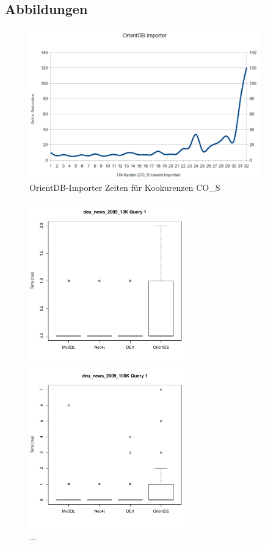 \documentclass[11pt, a4paper, oneside]{article} %
\begin{document}
\begin{appendix}
\section{Abbildungen}

\begin{figure}[htbp]
	\centering
	\includegraphics[width=10cm]{OrientImporter.png} 
	\caption{OrientDB-Importer Zeiten für Kookurenzen CO\_{}S}
	\label{fig:orientdb_import}
\end{figure}

\newpage
\thispagestyle{empty}

\begin{figure}[ht]
\begin{minipage}[hbt]{7cm}
	\centering
	\includegraphics[width=7cm]{../results/cold caches/images/10K_query1_boxplot}
	\caption{...}
	\label{fig:10k_query2_boxplot}
\end{minipage}
\hfill
\begin{minipage}[hbt]{7cm}
	\centering
	\includegraphics[width=7cm]{../results/cold caches/images/100K_query1_boxplot}
	\caption{...}
	\label{fig:100k_query1_boxplot}
\end{minipage}


\end{figure}
\end{appendix}
\end{document}
